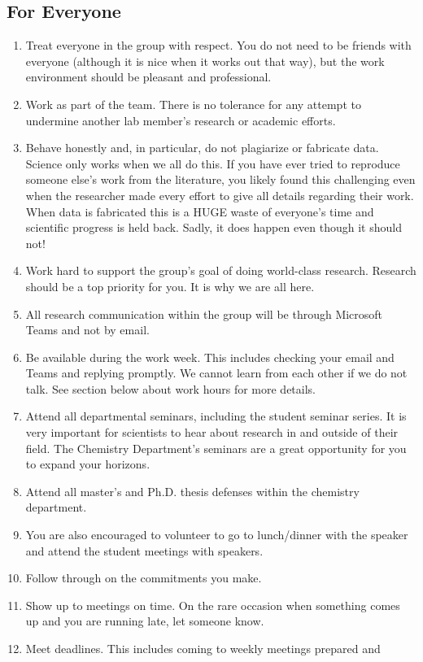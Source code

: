 \documentclass[letterpaper]{article}
\begin{document}
\subsection{For Everyone}
\begin{enumerate}
\item Treat everyone in the group with respect. You do not need to be friends with everyone (although it is nice when it works out that way), but the work environment should be pleasant and professional. 
\item Work as part of the team. There is  no tolerance for any attempt to undermine another lab member's research or academic efforts.
\item Behave honestly and, in particular, do not plagiarize or fabricate data. Science only works when we all do this. If you have ever tried to reproduce someone else's work from the literature, you likely found this challenging even when the researcher made every effort to give all details regarding their work. When data is fabricated this is a HUGE waste of everyone's time and scientific progress is held back. Sadly, it does happen even though it should not!
\item Work hard to support the group's goal of doing world-class research. Research should be a top priority for you. It is why we are all here. 
\item All research communication within the group will be through Microsoft Teams and not by email.
\item Be available during the work week. This includes checking your email and Teams and replying promptly. We cannot learn from each other if we do not talk. See section below about work hours for more details.
\item Attend all departmental seminars, including the student seminar series. It is very important for scientists to hear about research in and outside of their field. The Chemistry Department's seminars are a great opportunity for you to expand your horizons. 
\item Attend all master's and Ph.D. thesis defenses within the chemistry department.
\item You are also encouraged to volunteer to go to lunch/dinner with the speaker and attend the student meetings with speakers.
\item Follow through on the commitments you make.
\item Show up to meetings on time. On the rare occasion when something comes up and you are running late, let someone know.
\item Meet deadlines. This includes coming to weekly meetings prepared and 

\end{enumerate}
\end{document}
